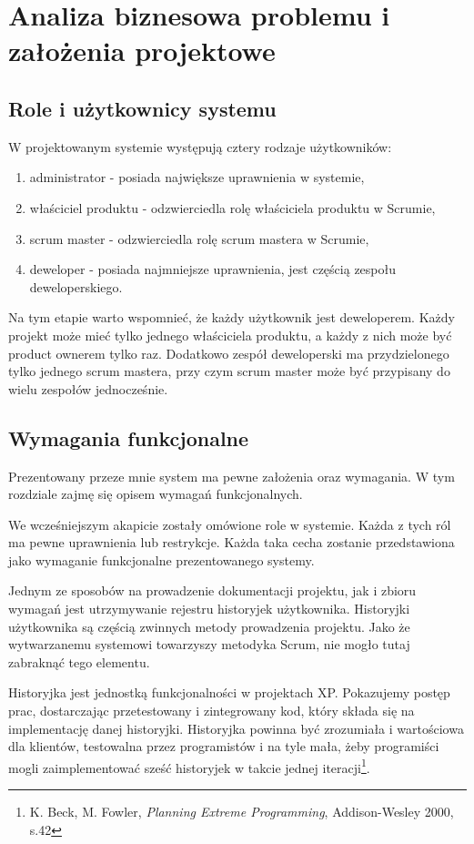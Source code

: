 \chapter{Analiza biznesowa problemu i założenia projektowe}

\section{Role i użytkownicy systemu}
W projektowanym systemie występują cztery rodzaje użytkowników:

\begin{enumerate}
	\item administrator - posiada największe uprawnienia w systemie,
	\item właściciel produktu - odzwierciedla rolę właściciela produktu w Scrumie,
	\item scrum master - odzwierciedla rolę scrum mastera w Scrumie,
	\item deweloper - posiada najmniejsze uprawnienia, jest częścią zespołu deweloperskiego.
\end{enumerate} 

Na tym etapie warto wspomnieć, że każdy użytkownik jest deweloperem. Każdy projekt może mieć tylko jednego właściciela produktu, a każdy z nich może być product ownerem tylko raz. Dodatkowo zespół deweloperski ma przydzielonego tylko jednego scrum mastera, przy czym scrum master może być przypisany do wielu zespołów jednocześnie.

\section{Wymagania funkcjonalne}
Prezentowany przeze mnie system ma pewne założenia oraz wymagania. W tym rozdziale zajmę się opisem wymagań funkcjonalnych. 

We wcześniejszym akapicie zostały omówione role w systemie. Każda z tych ról ma pewne uprawnienia lub restrykcje. Każda taka cecha zostanie przedstawiona jako wymaganie funkcjonalne prezentowanego systemy.

Jednym ze sposobów na prowadzenie dokumentacji projektu, jak i zbioru wymagań jest utrzymywanie rejestru historyjek użytkownika. Historyjki użytkownika są częścią zwinnych metody prowadzenia projektu. Jako że wytwarzanemu systemowi towarzyszy metodyka Scrum, nie mogło tutaj zabraknąć tego elementu.

\begin{italicquote}
	Historyjka jest jednostką funkcjonalności w projektach XP. Pokazujemy postęp prac, dostarczając przetestowany i zintegrowany kod, który składa się na implementację danej historyjki. Historyjka powinna być zrozumiała i wartościowa dla klientów, testowalna przez programistów i na tyle mała, żeby programiści mogli zaimplementować sześć historyjek w takcie jednej iteracji\footnote{K. Beck, M. Fowler, \textit{Planning Extreme Programming}, Addison-Wesley 2000, s.42}.
\end{italicquote}


